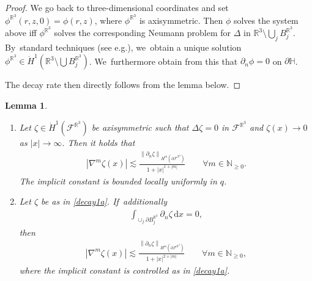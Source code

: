 \documentclass[10pt]{amsart}
\newcommand{\eg}{e.g.}
\newcommand{\skpt}{\par\smallskip\noindent}
\let\backslash\setminus
\newtheorem{lemma}[theorem]{Lemma}
\theoremstyle{definition}
\newcommand\R{\mathbb{R}}
\newcommand\N{\mathbb{N}}
\newcommand\norm[1]{\left\lVert #1\right\rVert}
\newcommand\eq{=}
\newcommand\dd{\,\mathrm{d}}
\newcommand\dx{\dd x}
\let\de\partial
\begin{document}
\begin{proof}
We go back to three-dimensional coordinates and set $\phi^{\R^3}(r,z,0)=\phi(r,z)$, where $\phi^{\R^3}$ is axisymmetric. Then $\phi$ solves the system above iff $\phi^{\R^3}$ solves the corresponding Neumann problem for $\Delta$ in $\R^3\backslash \bigcup_j B_j^{\R^3}$. By~standard techniques (see \eg \cite{Amrouche}), we~obtain a unique solution $\phi^{\R^3}\in \dot{H}^{1}(\R^3\backslash \bigcup B_j^{\R^3})$. We~furthermore obtain from this that $\de_n\phi=0$ on $\de\mathbb{H}$.

The decay rate then directly follows from the lemma below.
\end{proof}

\skpt
\begin{lemma}\label{decay1}
\begin{enumerate}
\item\label{decay1a}
Let $\zeta\in \dot{H}^1(\mathcal{F}^{\R^3})$ be axisymmetric such that $\Delta\zeta=0$ in $\mathcal{F}^{\R^3}$ and $\zeta(x)\to 0$ as $|x|\to\infty$. Then it holds that
\begin{align*}
\left|\nabla^m\zeta(x)\right|\lesssim \frac{\norm{\de_n\zeta}_{H^{m}(\de\mathcal{F}^{\R^3})}}{1+|x|^{1+|m|}}\qquad \forall m\in\N_{\geq 0}.
\end{align*}
The implicit constant is bounded locally uniformly in $q$.

\item\label{decay1b}
 Let $\zeta$ be as in \eqref{decay1a}. If~additionally
\begin{align*}
\int_{\cup_j \de B_j^{\R^3}}\de_n\zeta\dx\eq0,
\end{align*}
then
\begin{align*}
\left|\nabla^m\zeta(x)\right|\lesssim \frac{\norm{\de_n\zeta}_{H^{m}(\de\mathcal{F}^{\R^3})}}{1+|x|^{2+|m|}}\qquad \forall m\in\N_{\geq 0},
\end{align*}
where the implicit constant is controlled as in \eqref{decay1a}.
\end{enumerate}
\end{lemma}
\end{document}
